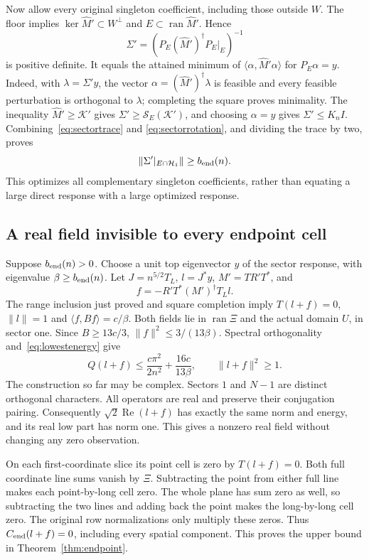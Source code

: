 \documentclass[11pt]{article}
\newcommand{\norm}[1]{\lVert#1\rVert}
\newcommand{\ip}[2]{\langle#1,#2\rangle}
\DeclareMathOperator{\ran}{ran}
\DeclareMathOperator{\Rea}{Re}
\theoremstyle{definition}
\theoremstyle{remark}
\begin{document}
Now allow every original singleton coefficient, including those outside
$W$. The floor implies $\ker\widehat M'\subset W^\perp$ and
$E\subset\ran\widehat M'$. Hence
\[
 \Sigma'=(P_E(\widehat M')^\dagger P_E|_E)^{-1}
\]
is positive definite. It equals the attained minimum of
$\ip\alpha{\widehat M'\alpha}$ for $P_E\alpha=y$.
Indeed, with $\lambda=\Sigma'y$, the vector
$\alpha=(\widehat M')^\dagger\lambda$ is feasible and every feasible
perturbation is orthogonal to $\lambda$; completing the square proves
minimality. The inequality $\widehat M'\ge\mathcal K'$ gives
$\Sigma'\ge\mathcal S_E(\mathcal K')$, and choosing $\alpha=y$ gives
$\Sigma'\le K_nI$. Combining~\eqref{eq:sectortrace} and
\eqref{eq:sectorrotation}, and dividing the trace by two, proves
\begin{equation}\label{eq:optimizedendpoint}
           \norm{\Sigma'|_{E\cap\mathcal H_1}}\ge b_{\rm end}(n).
\end{equation}
This optimizes all complementary singleton coefficients, rather than
equating a large direct response with a large optimized response.

\subsection{A real field invisible to every endpoint cell}
Suppose $b_{\rm end}(n)>0$. Choose a unit top eigenvector $y$ of the
sector response, with eigenvalue $\beta\ge b_{\rm end}(n)$.
Let $J=n^{5/2}T_L$, $l=J^*y$, $M'=TR'T^*$, and
\[
                       f=-R'T^*(M')^\dagger T_Ll.
\]
The range inclusion just proved and square completion imply
$T(l+f)=0$, $\norm l=1$ and $\ip f{Bf}=c/\beta$.
Both fields lie in $\ran\Xi$ and the actual domain $U$, in sector one.
Since $B\ge13c/3$, $\norm f^2\le3/(13\beta)$. Spectral orthogonality
and~\eqref{eq:lowestenergy} give
\begin{equation}\label{eq:endpointenergy}
 Q(l+f)\le\frac{c\pi^2}{2n^2}+\frac{16c}{13\beta},
 \qquad \norm{l+f}^2\ge1.
\end{equation}
The construction so far may be complex. Sectors $1$ and $N-1$ are
distinct orthogonal characters. All operators are real and preserve
their conjugation pairing. Consequently $\sqrt2\Rea(l+f)$ has exactly
the same norm and energy, and its real low part has norm one.
This gives a nonzero real field without changing any zero observation.

On each first-coordinate slice its point cell is zero by $T(l+f)=0$.
Both full coordinate line sums vanish by $\Xi$. Subtracting the point
from either full line makes each point-by-long cell zero. The whole plane
has sum zero as well, so subtracting the two lines and adding back the
point makes the long-by-long cell zero. The original row normalizations
only multiply these zeros. Thus $C_{\rm end}(l+f)=0$, including every
spatial component. This proves the upper bound in Theorem~\ref{thm:endpoint}.
\end{document}
